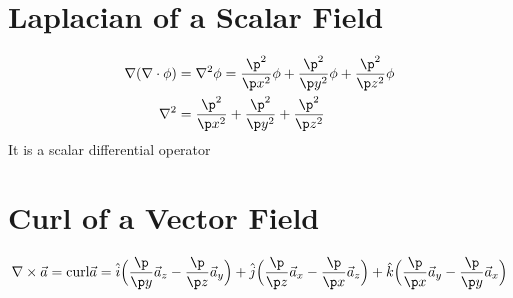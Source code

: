 \documentclass[a4paper, 11pt, normalem]{report}
\begin{document}
\section{Laplacian of a Scalar Field}
\begin{align*}
    \nabla(\nabla\cdot\phi) &= \nabla^2\phi = \frac{\p^2}{\p x^2}\phi + \frac{\p^2}{\p y^2}\phi + \frac{\p^2}{\p z^2}\phi \\
    \nabla^2 &= \frac{\p^2}{\p x^2} + \frac{\p^2}{\p y^2} + \frac{\p^2}{\p z^2}
\end{align*}
It is a scalar differential operator

\section{Curl of a Vector Field}
\begin{equation*}
    \nabla \times \vec{a} = \text{curl}\vec{a} = \hat{i}\Big(\frac{\p}{\p y}\vec{a}_z - \frac{\p}{\p z}\vec{a}_y\Big) + \hat{j}\Big(\frac{\p}{\p z}\vec{a}_x - \frac{\p}{\p x}\vec{a}_z\Big) + \hat{k}\Big(\frac{\p}{\p x}\vec{a}_y - \frac{\p}{\p y}\vec{a}_x\Big)
\end{equation*}
\end{document}
